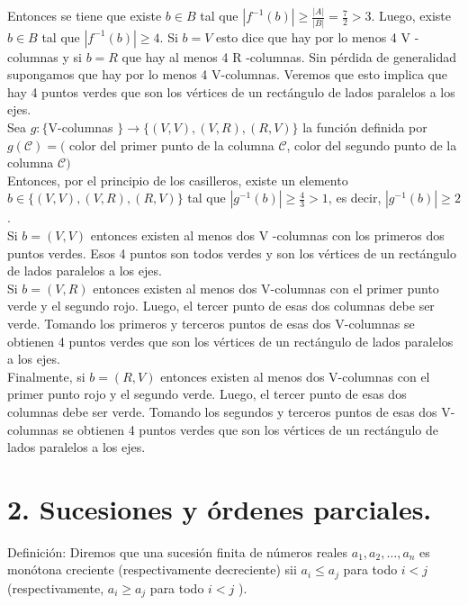 \documentclass[10pt]{article}
\begin{document}
Entonces se tiene que existe $b \in B$ tal que $\left|f^{-1}(b)\right| \geq \frac{|A|}{|B|}=\frac{7}{2}>3$. Luego, existe $b \in B$ tal que $\left|f^{-1}(b)\right| \geq 4$. Si $b=V$ esto dice que hay por lo menos 4 V -columnas y si $b=R$ que hay al menos 4 R -columnas. Sin pérdida de generalidad supongamos que hay por lo menos 4 V-columnas. Veremos que esto implica que hay 4 puntos verdes que son los vértices de un rectángulo de lados paralelos a los ejes.\\
Sea $g:\{\mathrm{V}$-columnas $\} \longrightarrow\{(V, V),(V, R),(R, V)\}$ la función definida por\\
$g(\mathcal{C})=($ color del primer punto de la columna $\mathcal{C}$, color del segundo punto de la columna $\mathcal{C})$\\
Entonces, por el principio de los casilleros, existe un elemento $b \in\{(V, V),(V, R),(R, V)\}$ tal que $\left|g^{-1}(b)\right| \geq \frac{4}{3}>1$, es decir, $\left|g^{-1}(b)\right| \geq 2$.\\
Si $b=(V, V)$ entonces existen al menos dos V -columnas con los primeros dos puntos verdes. Esos 4 puntos son todos verdes y son los vértices de un rectángulo de lados paralelos a los ejes.\\
Si $b=(V, R)$ entonces existen al menos dos V-columnas con el primer punto verde y el segundo rojo. Luego, el tercer punto de esas dos columnas debe ser verde. Tomando los primeros y terceros puntos de esas dos V-columnas se obtienen 4 puntos verdes que son los vértices de un rectángulo de lados paralelos a los ejes.\\
Finalmente, si $b=(R, V)$ entonces existen al menos dos V-columnas con el primer punto rojo y el segundo verde. Luego, el tercer punto de esas dos columnas debe ser verde. Tomando los segundos y terceros puntos de esas dos V-columnas se obtienen 4 puntos verdes que son los vértices de un rectángulo de lados paralelos a los ejes.

\section*{2. Sucesiones y órdenes parciales.}
Definición: Diremos que una sucesión finita de números reales $a_{1}, a_{2}, \ldots, a_{n}$ es monótona creciente (respectivamente decreciente) sii $a_{i} \leq a_{j}$ para todo $i<j$ (respectivamente, $a_{i} \geq a_{j}$ para todo $i<j$ ).
\end{document}
